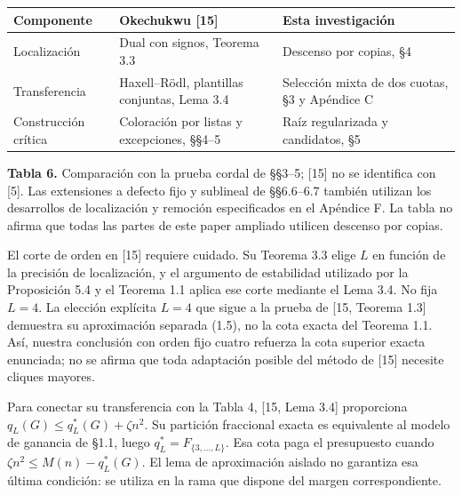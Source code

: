 \documentclass[spanish,11pt,a4paper]{article}
\newcounter{none}
\begin{document}
{\def\LTcaptype{none} %
\begin{longtable}[c]{@{}
  >{\raggedright\arraybackslash}p{}
  >{\raggedright\arraybackslash}p{}
  >{\raggedright\arraybackslash}p{}@{}}
\toprule\noalign{}
\begin{minipage}[b]{\linewidth}\raggedright
Componente
\end{minipage} & \begin{minipage}[b]{\linewidth}\raggedright
Okechukwu {[}15{]}
\end{minipage} & \begin{minipage}[b]{\linewidth}\raggedright
Esta investigación
\end{minipage} \\
\midrule\noalign{}
\endhead
\bottomrule\noalign{}
\endlastfoot
Localización & Dual con signos, Teorema 3.3 & Descenso por copias, §4 \\
Transferencia & Haxell--Rödl, plantillas conjuntas, Lema 3.4 & Selección mixta de dos cuotas, §3 y Apéndice C \\
Construcción crítica & Coloración por listas y excepciones, §§4--5 & Raíz regularizada y candidatos, §5 \\
\end{longtable}
}

\textbf{Tabla 6.} Comparación con la prueba cordal de §§3--5; {[}15{]} no se identifica con {[}5{]}. Las extensiones a defecto fijo y sublineal de §§6.6--6.7 también utilizan los desarrollos de localización y remoción especificados en el Apéndice F. La tabla no afirma que todas las partes de este paper ampliado utilicen descenso por copias.

El corte de orden en {[}15{]} requiere cuidado. Su Teorema 3.3 elige \(L\) en función de la precisión de localización, y el argumento de estabilidad utilizado por la Proposición 5.4 y el Teorema 1.1 aplica ese corte mediante el Lema 3.4. No fija \(L=4\). La elección explícita \(L=4\) que sigue a la prueba de {[}15, Teorema 1.3{]} demuestra su aproximación separada (1.5), no la cota exacta del Teorema 1.1. Así, nuestra conclusión con orden fijo cuatro refuerza la cota superior exacta enunciada; no se afirma que toda adaptación posible del método de {[}15{]} necesite cliques mayores.

Para conectar su transferencia con la Tabla 4, {[}15, Lema 3.4{]} proporciona \(q_L(G)\le q_L^*(G)+\zeta n^2\). Su partición fraccional exacta es equivalente al modelo de ganancia de §1.1, luego \(q_L^*=F_{\{3,\ldots,L\}}\). Esa cota paga el presupuesto cuando \(\zeta n^2\le M(n)-q_L^*(G)\). El lema de aproximación aislado no garantiza esa última condición: se utiliza en la rama que dispone del margen correspondiente.
\end{document}
